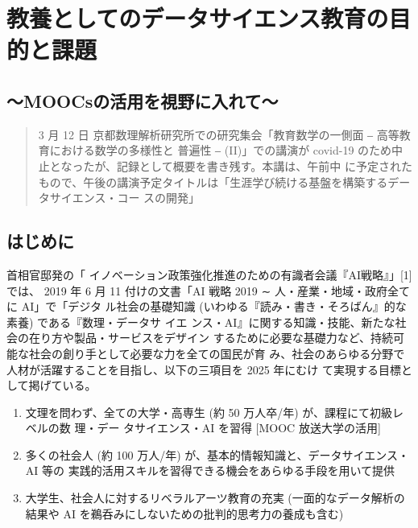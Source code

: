\documentclass[
]{book}
\theoremstyle{definition}
\theoremstyle{definition}
\theoremstyle{definition}
\theoremstyle{definition}
\theoremstyle{remark}
\begin{document}
\hypertarget{math2020}{%
\chapter{教養としてのデータサイエンス教育の目的と課題}\label{math2020}}

\hypertarget{moocsux306eux6d3bux7528ux3092ux8996ux91ceux306bux5165ux308cux3066-1}{%
\section*{～MOOCsの活用を視野に入れて～}\label{moocsux306eux6d3bux7528ux3092ux8996ux91ceux306bux5165ux308cux3066-1}}

\begin{quote}
3 月 12 日 京都数理解析研究所での研究集会「教育数学の一側面 ‒ 高等教育における数学の多様性と 普遍性 ‒ (II)」での講演が covid-19 のため中止となったが、記録として概要を書き残す。本講は、午前中 に予定されたもので、午後の講演予定タイトルは「生涯学び続ける基盤を構築するデータサイエンス・コー スの開発」
\end{quote}

\hypertarget{ux306fux3058ux3081ux306b-1}{%
\section{はじめに}\label{ux306fux3058ux3081ux306b-1}}

首相官邸発の「 イノベーション政策強化推進のための有識者会議『AI戦略』」{[}1{]} では、 2019 年 6 月 11 付けの文書「AI 戦略 2019 ∼ 人・産業・地域・政府全てに AI」で「デジタ ル社会の基礎知識 (いわゆる『読み・書き・そろばん』的な素養) である『数理・データサ イエ ンス・AI』に関する知識・技能、新たな社会の在り方や製品・サービスをデザイン するために必要な基礎力など、持続可能な社会の創り手として必要な力を全ての国民が育 み、社会のあらゆる分野で人材が活躍することを目指し、以下の三項目を 2025 年にむけ て実現する目標として掲げている。

\begin{enumerate}
\def\labelenumi{\arabic{enumi}.}
\item
  文理を問わず、全ての大学・高専生 (約 50 万人卒/年) が、課程にて初級レベルの数 理・デー タサイエンス・AI を習得 {[}MOOC 放送大学の活用{]}
\item
  多くの社会人 (約 100 万人/年) が、基本的情報知識と、データサイエンス・AI 等の 実践的活用スキルを習得できる機会をあらゆる手段を用いて提供
\item
  大学生、社会人に対するリベラルアーツ教育の充実 (一面的なデータ解析の結果や AI を鵜呑みにしないための批判的思考力の養成も含む)
\end{enumerate}
\end{document}
